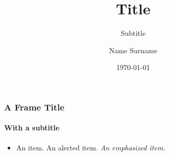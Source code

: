 \documentclass[10pt]{beamer}
\title{Title}
\subtitle{Subtitle}
\author[N. Surname]{Name Surname}
\institute[ShortConf]{Conference Name}
\date[\today]{\today}
\begin{document}
\maketitle

\begin{frame}
	\frametitle{A Frame Title}
	\framesubtitle{With a subtitle}
	\begin{itemize}
		\item An item.
		\atem \alert{An alerted item.}
		\etem \emph{An emphasized item.}
	\end{itemize}
\end{frame}

\thankyou
\end{document}
